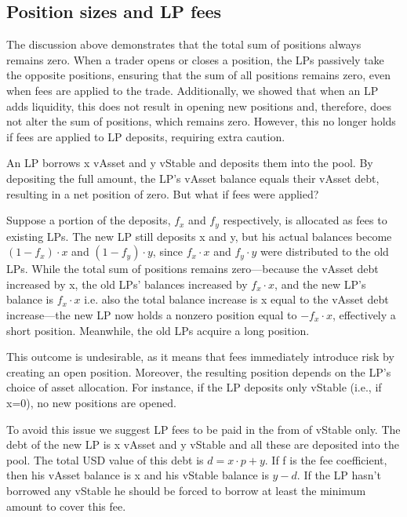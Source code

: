 \documentclass{article}
\begin{document}
\subsection{Position sizes and LP fees}\label{LP fees issue}

The discussion above demonstrates that the total sum of positions always remains zero. When a trader opens or closes a position, the LPs passively take the opposite positions, ensuring that the sum of all positions remains zero, even when fees are applied to the trade. Additionally, we showed that when an LP adds liquidity, this does not result in opening new positions and, therefore, does not alter the sum of positions, which remains zero. However, this no longer holds if fees are applied to LP deposits, requiring extra caution.

An LP borrows x vAsset and y vStable and deposits them into the pool. By depositing the full amount, the LP’s vAsset balance equals their vAsset debt, resulting in a net position of zero. But what if fees were applied?

Suppose a portion of the deposits, $f_x$ and $f_y$ respectively, is allocated as fees to existing LPs. The new LP still deposits x and y, but his actual balances become $(1-f_x)\cdot x$ and $(1-f_y)\cdot y$, since $f_x \cdot x$ and $f_y \cdot y$ were distributed to the old LPs. While the total sum of positions remains zero—because the vAsset debt increased by x, the old LPs' balances increased by $f_x \cdot x$, and the new LP’s balance is $f_x \cdot x$ i.e. also the total balance increase is x equal to the vAsset debt increase—the new LP now holds a nonzero position equal to $-f_x \cdot x$, effectively a short position. Meanwhile, the old LPs acquire a long position.

This outcome is undesirable, as it means that fees immediately introduce risk by creating an open position. Moreover, the resulting position depends on the LP’s choice of asset allocation. For instance, if the LP deposits only vStable (i.e., if x=0), no new positions are opened.

To avoid this issue we suggest LP fees to be paid in the from of vStable only. The debt of the new LP is x vAsset and y vStable and all these are deposited into the pool. The total USD value of this debt is $d=x\cdot p + y$. If f is the fee coefficient, then his vAsset balance is x and his vStable balance is $y-d$.
If the LP hasn't borrowed any vStable he should be forced to borrow at least the minimum amount to cover this fee.
\end{document}
